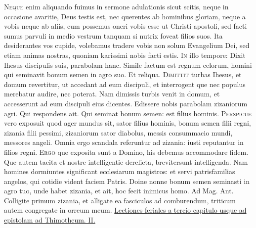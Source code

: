 \begin{multicols*}{2}
\lettrine[lines=2]{\zallmancaps \color{Blue} N}{eque} enim aliquando fuimus in sermone adulationis sicut scitis, neque in occasione avaritie, Deus testis est, nec querentes ab hominibus gloriam, neque a vobis neque ab aliis, cum possemus oneri vobis esse ut Christi apostoli, sed facti sumus parvuli in medio vestrum tanquam si nutrix foveat filios suos. Ita desiderantes vos cupide, volebamus tradere vobis non solum Evangelium Dei, sed etiam animas nostras, quoniam karissimi nobis facti estis.
\lettrine[lines=2]{\zallmancaps \color{Red} I}{n} illo tempore: Dixit Ihesus discipulis suis, parabolam hanc. Simile factum est regnum celorum, homini qui seminavit bonum semen in agro suo. Et reliqua.
\lettrine[lines=2]{\zallmancaps \color{Blue} D}{imittit} turbas Ihesus, et domum revertitur, ut accedant ad eum discipuli, et interrogent que nec populus merebatur
audire, nec poterat. Nam dimissis turbis venit in domum, et accesserunt ad eum discipuli eius dicentes. Edissere nobis parabolam zizaniorum agri. Qui respondens ait. Qui seminat bonum semen: est filius hominis.
\lettrine[lines=2]{\zallmancaps \color{Red} P}{erspicue} vero exposuit quod ager mundus sit, sator filius hominis, bonum semen filii regni, zizania filii pessimi, zizaniorum sator diabolus, messis consummacio mundi, messores angeli. Omnia ergo scandala referuntur ad zizania: iusti reputantur in filios regni.
\lettrine[lines=2]{\zallmancaps \color{Blue} E}{rgo} que exposita sunt a Domino, his debemus accommodare fidem. Que autem tacita et nostre intelligentie derelicta, brevitersunt intelligenda. Nam homines dormiuntes significant ecclesiarum magistros: et servi patrisfamilias angelos, qui cotidie vident faciem Patris.
 Doine nonne bonum semen seminasti in agro tuo, unde habet zizania, et ait, hoc fecit inimicus homo. {\color{Red} Ad Mag. Ant.} Colligite primum zizania, et alligate ea fasciculos ad comburendum, triticum autem congregate in orreum meum.
\newline \ul{Lectiones feriales a tercio capitulo usque ad epistolam ad Thimotheum. II.}
{\color{Red} }

\end{multicols*}
